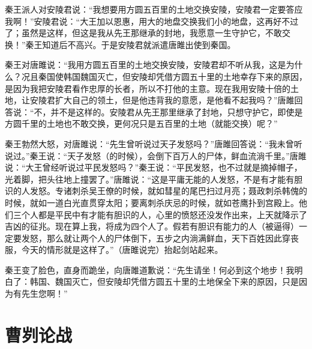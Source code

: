 \documentclass[12pt,UTF-8,openany,a4]{ctexbook}
\begin{document}
\begin{large}
    \yiwen 
    秦王派人对安陵君说：“我想要用方圆五百里的土地交换安陵，安陵君一定要答应我啊！”安陵君说：“大王加以恩惠，用大的地盘交换我们小的地盘，这再好不过了；虽然是这样，但这是我从先王那继承的封地，我愿意一生守护它，不敢交换！”秦王知道后不高兴。于是安陵君就派遣唐雎出使到秦国。
    
    秦王对唐雎说：“我用方圆五百里的土地交换安陵，安陵君却不听从我，这是为什么？况且秦国使韩国魏国灭亡，但安陵却凭借方圆五十里的土地幸存下来的原因，是因为我把安陵君看作忠厚的长者，所以不打他的主意。现在我用安陵十倍的土地，让安陵君扩大自己的领土，但是他违背我的意愿，是他看不起我吗？”唐雎回答说：“不，并不是这样的。安陵君从先王那里继承了封地，只想守护它，即使是方圆千里的土地也不敢交换，更何况只是五百里的土地（就能交换）呢？”
    
    秦王勃然大怒，对唐雎说：“先生曾听说过天子发怒吗？”唐雎回答说：“我未曾听说过。”秦王说：“天子发怒（的时候），会倒下百万人的尸体，鲜血流淌千里。”唐雎说：“大王曾经听说过平民发怒吗？”秦王说：“平民发怒，也不过就是摘掉帽子，光着脚，把头往地上撞罢了。”唐雎说：“这是平庸无能的人发怒，不是有才能有胆识的人发怒。专诸刺杀吴王僚的时候，就如彗星的尾巴扫过月亮；聂政刺杀韩傀的时候，就如一道白光直贯穿太阳；要离刺杀庆忌的时候，就如苍鹰扑到宫殿上。他们三个人都是平民中有才能有胆识的人，心里的愤怒还没发作出来，上天就降示了吉凶的征兆。现在算上我，将成为四个人了。假若有胆识有能力的人（被逼得）一定要发怒，那么就让两个人的尸体倒下，五步之内淌满鲜血，天下百姓因此穿丧服，今天的情形就是这样了。”（唐雎说完）抬起剑站起来。
    
    秦王变了脸色，直身而跪坐，向唐雎道歉说：“先生请坐！何必到这个地步！我明白了：韩国、魏国灭亡，但安陵却凭借方圆五十里的土地保全下来的原因，只是因为有先生您啊！”
    
\end{large}



\chapter{曹刿论战}
\end{document}
